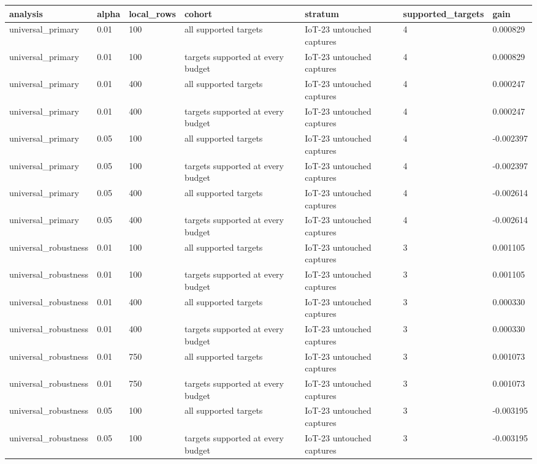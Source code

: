 \begin{tabular}{lllllll}
\toprule
analysis & alpha & local\_rows & cohort & stratum & supported\_targets & gain \\
\midrule
universal\_primary & 0.01 & 100 & all supported targets & IoT-23 untouched captures & 4 & 0.000829 \\
universal\_primary & 0.01 & 100 & targets supported at every budget & IoT-23 untouched captures & 4 & 0.000829 \\
universal\_primary & 0.01 & 400 & all supported targets & IoT-23 untouched captures & 4 & 0.000247 \\
universal\_primary & 0.01 & 400 & targets supported at every budget & IoT-23 untouched captures & 4 & 0.000247 \\
universal\_primary & 0.05 & 100 & all supported targets & IoT-23 untouched captures & 4 & -0.002397 \\
universal\_primary & 0.05 & 100 & targets supported at every budget & IoT-23 untouched captures & 4 & -0.002397 \\
universal\_primary & 0.05 & 400 & all supported targets & IoT-23 untouched captures & 4 & -0.002614 \\
universal\_primary & 0.05 & 400 & targets supported at every budget & IoT-23 untouched captures & 4 & -0.002614 \\
universal\_robustness & 0.01 & 100 & all supported targets & IoT-23 untouched captures & 3 & 0.001105 \\
universal\_robustness & 0.01 & 100 & targets supported at every budget & IoT-23 untouched captures & 3 & 0.001105 \\
universal\_robustness & 0.01 & 400 & all supported targets & IoT-23 untouched captures & 3 & 0.000330 \\
universal\_robustness & 0.01 & 400 & targets supported at every budget & IoT-23 untouched captures & 3 & 0.000330 \\
universal\_robustness & 0.01 & 750 & all supported targets & IoT-23 untouched captures & 3 & 0.001073 \\
universal\_robustness & 0.01 & 750 & targets supported at every budget & IoT-23 untouched captures & 3 & 0.001073 \\
universal\_robustness & 0.05 & 100 & all supported targets & IoT-23 untouched captures & 3 & -0.003195 \\
universal\_robustness & 0.05 & 100 & targets supported at every budget & IoT-23 untouched captures & 3 & -0.003195 \\

\end{tabular}
